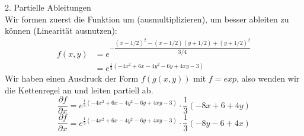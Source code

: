 \documentclass{article}
\begin{document}
	 	2. Partielle Ableitungen\\
	 	Wir formen zuerst die Funktion um (ausmultiplizieren), um besser ableiten zu können (Linearität ausnutzen):
	 	\begin{align*}
	 		f(x,y) &= e^{-\dfrac{(x-1/2)^2 - (x-1/2)(y+1/2) + (y+1/2)^2}{3/4}} \\
	 		&= e^{\frac{1}{3}( -4x^2 + 6x - 4y^2 - 6y + 4xy - 3 )}
	 	\end{align*}
	 	Wir haben einen Ausdruck der Form $f(g(x,y))$ mit $f=exp$, also wenden wir die Kettenregel an und leiten partiell ab.
	 	\[
	 		\dfrac{\partial f}{\partial x} = e^{\frac{1}{3}( -4x^2 + 6x - 4y^2 - 6y + 4xy - 3 )} \cdot \dfrac{1}{3} (-8x + 6 + 4y)
	 	\]
	 	\[
	 		\dfrac{\partial f}{\partial x} = e^{\frac{1}{3}( -4x^2 + 6x - 4y^2 - 6y + 4xy - 3 )} \cdot \dfrac{1}{3} (-8y - 6 + 4x)
	 	\]\\
	 	
\end{document}
